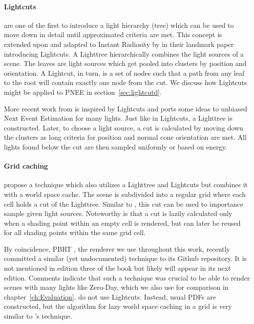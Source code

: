 \paragraph{Lightcuts}

\textcite{DBLP:journals/cgf/PaquettePD98} are one of the first to introduce a light hierarchy (tree) which can be used to move down in detail until approximated criteria are met. This concept is extended upon and adapted to Instant Radiosity by \textcite{Walter2005LightcutsAS} in their landmark paper introducing Lightcuts. A Lighttree hierarchically combines the light sources of a scene. The leaves are light sources which get pooled into clusters by position and orientation. A Lightcut, in turn, is a set of nodes such that a path from any leaf to the root will contain exactly one node from the cut. We discuss how Lightcuts might be applied to PNEE in section~\ref{sec:lightcutd}.

More recent work from \textcite{Estevez} is inspired by Lightcuts and ports some ideas to unbiased Next Event Estimation for many lights. Just like in Lightcuts, a Lighttree is constructed. Later, to choose a light source, a cut is calculated by moving down the clusters as long criteria for position and normal cone orientation are met. All lights found below the cut are then sampled uniformly or based on energy.

\paragraph{Grid caching}

\textcite{Vevoda} propose a technique which also utilizes a Lighttree and Lightcuts but combines it with a world space cache. The scene is subdivided into a regular grid where each cell holds a cut of the Lighttree. Similar to \citeauthor{Estevez}, this cut can be used to importance sample given light sources. Noteworthy is that a cut is lazily calculated only when a shading point within an empty cell is rendered, but can later be reused for all shading points within the same grid cell.

By coincidence, PBRT \parencite{pbrt}, the renderer we use throughout this work, recently committed a similar (yet undocumented) technique to its Github repository. It is not mentioned in edition three of the book but likely will appear in its next edition. Comments indicate that such a technique was crucial to be able to render scenes with many lights like Zero-Day, which we also use for comparison in chapter~\ref{ch:Evaluation}. \citeauthor{pbrt} do not use Lightcuts. Instead, usual PDFs are constructed, but the algorithm for lazy world space caching in a grid is very similar to \citeauthor{Vevoda}'s technique.

